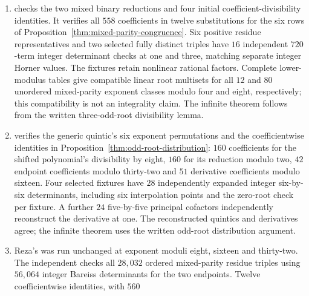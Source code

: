 \begin{enumerate}
positive residue representatives, a separate $720$-term integer
determinant expansion checks both endpoint values, for $70$ checks.
The eight parity reductions and five simultaneous modulo-three exclusions
are verified against direct quotient characteristic polynomials.
Two selected fully distinct triples have independent endpoint determinants
and exact Sturm counts; two known repeated-exponent controls retain their
endpoint zeros. The infinite classes in
Proposition~\ref{thm:modulo-three-endpoints} use the written low-root proof.
This is a residue enumeration, not an exponent search.
\item {} checks the two
mixed binary reductions and four initial coefficient-divisibility identities.
It verifies all $558$ coefficients in twelve substitutions for the six
rows of Proposition~\ref{thm:mixed-parity-congruence}. Six positive residue
representatives and two selected fully distinct triples have $16$
independent $720$-term integer determinant checks at one and three,
matching separate integer Horner values. The fixtures retain nonlinear
rational factors. Complete lower-modulus tables give compatible linear
root multisets for all $12$ and $80$ unordered mixed-parity exponent
classes modulo four and eight, respectively; this compatibility is not
an integrality claim. The infinite theorem follows from the written
three-odd-root divisibility lemma.
\item {} verifies the generic
quintic's six exponent permutations and the coefficientwise identities
in Proposition~\ref{thm:odd-root-distribution}: $160$ coefficients for the
shifted polynomial's divisibility by eight, $160$ for its reduction
modulo two, $42$ endpoint coefficients modulo thirty-two and $51$
derivative coefficients modulo sixteen. Four selected fixtures have
$28$ independently expanded integer six-by-six determinants, including
six interpolation points and the zero-root check per fixture. A further
$24$ five-by-five principal cofactors independently reconstruct the
derivative at one. The reconstructed quintics and derivatives agree;
the infinite theorem uses the written odd-root distribution argument.
\item Reza's  was run unchanged
at exponent moduli eight, sixteen and thirty-two. The independent
 checks all $28{,}032$ ordered
mixed-parity residue triples using $56{,}064$ integer Bareiss determinants
for the two endpoints. Twelve coefficientwise identities, with $560$

\end{enumerate}
